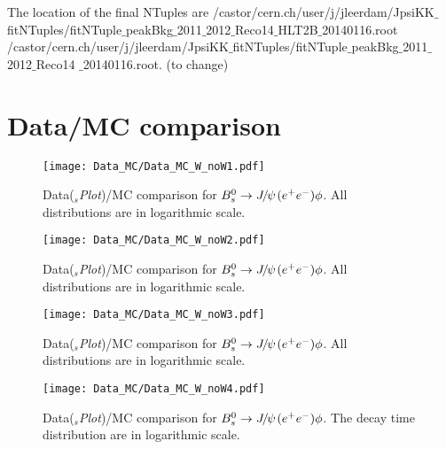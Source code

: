  The location of the final NTuples are /castor/cern.ch/user/j/jleerdam/JpsiKK$\_$fitNTuples/fitNTuple$\_$peakBkg$\_$2011$\_$2012$\_$Reco14$\_$HLT2B$\_$20140116.root\\
 /castor/cern.ch/user/j/jleerdam/JpsiKK$\_$fitNTuples/fitNTuple$\_$peakBkg$\_$2011$\_$2012$\_$Reco14 $\_$20140116.root. (to change)
\clearpage

\section{Data/MC comparison}\label{sec:app:DataMC}
 
 \begin{figure}[htb]
  \begin{center}
    \texttt{[image: Data\_MC/Data\_MC\_W\_noW1.pdf]} \\
  \end{center}
  \caption{
   Data({\it $_{s}$Plot})/MC comparison for ${{B}^0_{s}}\rightarrow{\ensuremath{{J\mskip -3mu/\mskip -2mu\psi\mskip 2mu}}}(e^{+}e^{-})\phi$. All distributions are in logarithmic scale.
}
  \label{fig:app:DataMC1}
\end{figure}
 \begin{figure}[tb]
  \begin{center}
    \texttt{[image: Data\_MC/Data\_MC\_W\_noW2.pdf]} \\
  \end{center}
  \caption{
   Data({\it $_{s}$Plot})/MC comparison for ${{B}^0_{s}}\rightarrow{\ensuremath{{J\mskip -3mu/\mskip -2mu\psi\mskip 2mu}}}(e^{+}e^{-})\phi$. All distributions are in logarithmic scale.
}
  \label{fig:app:DataMC2}
\end{figure}
 \begin{figure}[tb]
  \begin{center}
    \texttt{[image: Data\_MC/Data\_MC\_W\_noW3.pdf]} \\
  \end{center}
  \caption{
   Data({\it $_{s}$Plot})/MC comparison for ${{B}^0_{s}}\rightarrow{\ensuremath{{J\mskip -3mu/\mskip -2mu\psi\mskip 2mu}}}(e^{+}e^{-})\phi$. All distributions are in logarithmic scale.
}
  \label{fig:app:DataMC3}
\end{figure}
 \begin{figure}[tb]
  \begin{center}
    \texttt{[image: Data\_MC/Data\_MC\_W\_noW4.pdf]} \\
  \end{center}
  \caption{
   Data({\it $_{s}$Plot})/MC comparison for ${{B}^0_{s}}\rightarrow{\ensuremath{{J\mskip -3mu/\mskip -2mu\psi\mskip 2mu}}}(e^{+}e^{-})\phi$. The decay time distribution are in logarithmic scale.
}
  \label{fig:app:DataMC4}
\end{figure}

